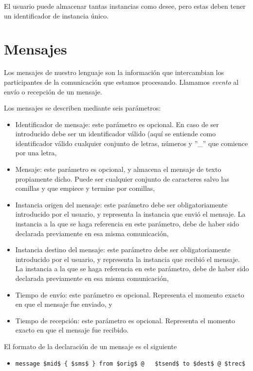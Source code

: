 El usuario puede almacenar tantas instancias como desee, pero estas
deben tener un identificador de instancia único.

\section{Mensajes}\label{sec:Mensajes}

Los mensajes de nuestro lenguaje son la información que intercambian
los participantes de la comunicación que estamos procesando. Llamamos
\textit{evento} al envío o recepción de un mensaje.

Los mensajes se describen mediante seis parámetros:

\begin{itemize}
\item Identificador de mensaje: este parámetro es opcional. En caso de
  ser introducido debe ser un identificador válido (aquí se entiende
  como identificador válido cualquier conjunto de letras, números y
  ''\_'' que comience por una letra,
\item Mensaje: este parámetro es opcional, y almacena el mensaje de
  texto propiamente dicho. Puede ser cualquier conjunto de caracteres
  salvo las comillas y que empiece y termine por comillas,
\item Instancia origen del mensaje: este parámetro debe ser
  obligatoriamente introducido por el usuario, y representa la
  instancia que envió el mensaje. La instancia a la que se haga
  referencia en este parámetro, debe de haber sido declarada
  previamente en esa misma comunicación,
\item Instancia destino del mensaje: este parámetro debe ser
  obligatoriamente introducido por el usuario, y representa la
  instancia que recibió el mensaje. La instancia a la que se haga
  referencia en este parámetro, debe de haber sido declarada
  previamente en esa misma comunicación,
\item Tiempo de envío: este parámetro es opcional. Representa el
  momento exacto en que el mensaje fue enviado, y
\item Tiempo de recepción: este parámetro es opcional. Representa el
  momento exacto en que el mensaje fue recibido.
\end{itemize}

El formato de la declaración de un mensaje es el siguiente

\begin{itemize}
\item \lstinline[mathescape]!message $mid$ { $sms$ } from $orig$ @
  $tsend$ to $dest$ @ $trec$! 
\end{itemize}

